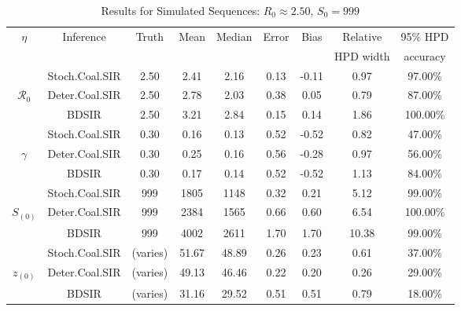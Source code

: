 \documentclass[12pt,titlepage]{article}
\begin{document}
\begin{table}[!ht]
\begin{center}
\caption{\large{Results for Simulated Sequences:  $R_{0} \approx 2.50$, $S_{0}=999$}}
\label{table:simSeq}
\begin{tabular}{|c|c|c|c|c|c|c|c|c|}
\hline
$\eta$ & Inference & Truth & Mean & Median & Error & Bias & Relative & 95\% HPD \\ 
&  &  &  &  &  &  &  HPD width & accuracy \\ 
	\hline
	\hline
& Stoch.Coal.SIR & 2.50 & 2.41 & 2.16 & 0.13 & -0.11 & 0.97 & 97.00\% \\
$\mathcal{R}_0$ & Deter.Coal.SIR & 2.50 & 2.78 & 2.03 & 0.38 & 0.05 & 0.79 & 87.00\% \\
& BDSIR & 2.50 & 3.21 & 2.84 & 0.15 & 0.14 & 1.86 & 100.00\% \\
   \hline
   \hline 
& Stoch.Coal.SIR & 0.30 & 0.16 & 0.13 & 0.52 & -0.52 & 0.82 & 47.00\% \\
$\gamma$ & Deter.Coal.SIR & 0.30 & 0.25 & 0.16 & 0.56 & -0.28 & 0.97 & 56.00\% \\
& BDSIR & 0.30 & 0.17 & 0.14 & 0.52 & -0.52 & 1.13 & 84.00\% \\
   \hline
   \hline
& Stoch.Coal.SIR & 999 & 1805 & 1148 & 0.32 & 0.21 & 5.12 & 99.00\% \\
$S_{(0)}$ & Deter.Coal.SIR & 999 & 2384 & 1565 & 0.66 & 0.60 & 6.54 & 100.00\% \\
& BDSIR & 999 & 4002 & 2611 & 1.70 & 1.70 & 10.38 & 99.00\% \\
   \hline
   \hline
& Stoch.Coal.SIR & (varies) & 51.67 & 48.89 & 0.26 & 0.23 & 0.61 & 37.00\% \\
$z_{(0)}$ & Deter.Coal.SIR & (varies) & 49.13 & 46.46 & 0.22 & 0.20 & 0.26 & 29.00\% \\
& BDSIR & (varies) & 31.16 & 29.52 & 0.51 & 0.51 & 0.79 & 18.00\% \\
   \hline
\end{tabular}
\end{center}
 \end{table}
% 
%
\end{document}
